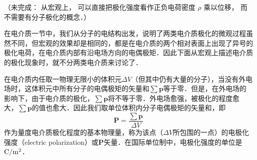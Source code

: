 

（未完成： 从宏观上， 可以直接把极化强度看作正负电荷密度 $\rho$ 乘以位移， 而不需要有分子极化的概念．）

在电介质一节中，我们从分子的电结构出发，说明了两类电介质极化的微观过程虽然不同，但宏观的效果却是相同的，都是在电介质的两个相对表面上出现了异号的极化电荷，在电介质内部有沿电场方向的电偶极矩．因此下面从宏观上描述电介质的极化现象时，就不分两类电介质来讨论了．

在电介质内任取一物理无限小的体积元$\Delta V$（但其中仍有大量的分子），当没有外电场时，这体积元中所有分子的电偶极矩的矢量和$\sum \mathbf p$等于零．但是，在外电场的影响下，由于电介质的极化，$\sum \mathbf p$将不等于零．外电场愈强，被极化的程度愈大，$\sum \mathbf p$的值也愈大．因此我们取单位体积内分子电偶极矩的矢量和，即
\begin{equation}
\mathbf P=\frac{\sum \mathbf p}{\Delta V} 
\end{equation}
作为量度电介质极化程度的基本物理量，称为该点（$\Delta V$所包围的一点）的电极化强度（electric polarization）或$\mathbf P$矢量．在国际单位制中，电极化强度的单位是$\rm C/m^2$．


